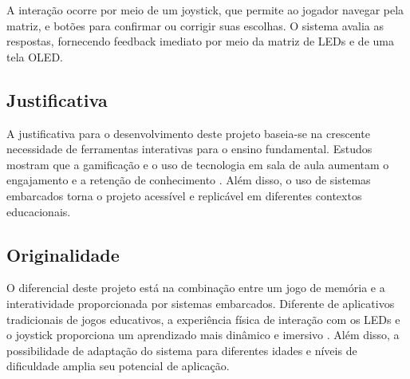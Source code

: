 A interação ocorre por meio de um joystick, que permite ao jogador navegar pela matriz, e botões para confirmar ou corrigir suas escolhas. O sistema avalia as respostas, fornecendo feedback imediato por meio da matriz de LEDs e de uma tela OLED.

\subsection{Justificativa}
A justificativa para o desenvolvimento deste projeto baseia-se na crescente necessidade de ferramentas interativas para o ensino fundamental. Estudos mostram que a gamificação e o uso de tecnologia em sala de aula aumentam o engajamento e a retenção de conhecimento \cite{gee2003video}. Além disso, o uso de sistemas embarcados torna o projeto acessível e replicável em diferentes contextos educacionais.

\subsection{Originalidade}
O diferencial deste projeto está na combinação entre um jogo de memória e a interatividade proporcionada por sistemas embarcados. Diferente de aplicativos tradicionais de jogos educativos, a experiência física de interação com os LEDs e o joystick proporciona um aprendizado mais dinâmico e imersivo \cite{papert1980mindstorms}. Além disso, a possibilidade de adaptação do sistema para diferentes idades e níveis de dificuldade amplia seu potencial de aplicação.







